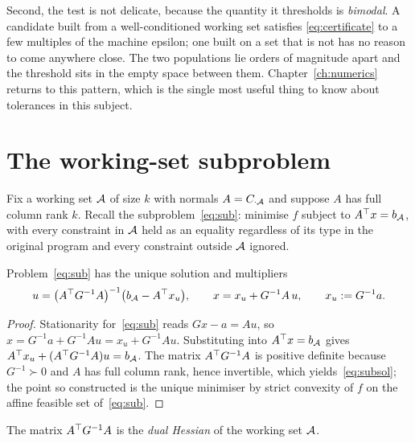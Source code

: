 Second, the test is not delicate, because the quantity it thresholds is
\emph{bimodal}. A candidate built from a well-conditioned working set satisfies
\eqref{eq:certificate} to a few multiples of the machine epsilon; one built on a
set that is not has no reason to come anywhere close. The two populations lie
orders of magnitude apart and the threshold sits in the empty space between them.
Chapter~\ref{ch:numerics} returns to this pattern, which is the single most useful
thing to know about tolerances in this subject.

\section{The working-set subproblem}

Fix a working set $\mathcal{A}$ of size $k$ with normals $A = C_{\cdot\mathcal{A}}$ and
suppose $A$ has full column rank $k$. Recall the subproblem~\eqref{eq:sub}: minimise
$f$ subject to $A^{\top} x = b_{\mathcal{A}}$, with every constraint in $\mathcal{A}$ held as an
equality regardless of its type in the original program and every constraint
outside $\mathcal{A}$ ignored.

\begin{proposition}
\label{prop:sub}
Problem~\eqref{eq:sub} has the unique solution and multipliers
\begin{equation}
  u = \bigl(A^{\top} G^{-1} A\bigr)^{-1}\bigl(b_{\mathcal{A}} - A^{\top} x_u\bigr),
  \qquad
  x = x_u + G^{-1} A\, u,
  \qquad x_u := G^{-1} a .
  \label{eq:subsol}
\end{equation}
\end{proposition}

\begin{proof}
Stationarity for~\eqref{eq:sub} reads $Gx - a = Au$, so
$x = G^{-1}a + G^{-1}Au = x_u + G^{-1}Au$. Substituting into $A^{\top} x = b_{\mathcal{A}}$
gives $A^{\top} x_u + (A^{\top} G^{-1}A)u = b_{\mathcal{A}}$. The matrix $A^{\top} G^{-1}A$ is positive
definite because $G^{-1} \succ 0$ and $A$ has full column rank, hence invertible,
which yields~\eqref{eq:subsol}; the point so constructed is the unique minimiser by
strict convexity of $f$ on the affine feasible set of~\eqref{eq:sub}.
\end{proof}

\begin{definition}
\label{def:dualhessian}
The matrix $A^{\top} G^{-1} A$ is the \emph{dual Hessian} of the working set $\mathcal{A}$.
\end{definition}

